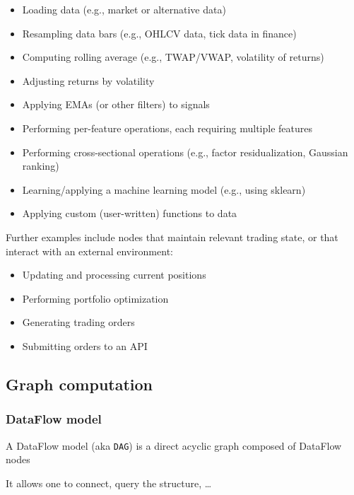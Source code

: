 \documentclass[11pt, reqno]{amsart}
\theoremstyle{definition}
\theoremstyle{remark}
\begin{document}
\begin{itemize}
  \item Loading data (e.g., market or alternative data)
  \item Resampling data bars (e.g., OHLCV data, tick data in finance)
  \item Computing rolling average (e.g., TWAP/VWAP, volatility of returns)
  \item Adjusting returns by volatility
  \item Applying EMAs (or other filters) to signals
  \item Performing per-feature operations, each requiring multiple features
  \item Performing cross-sectional operations (e.g., factor residualization,
        Gaussian ranking)
  \item Learning/applying a machine learning model (e.g., using sklearn)
  \item Applying custom (user-written) functions to data
\end{itemize}

Further examples include nodes that maintain relevant trading state, or
that interact with an external environment:

\begin{itemize}
  \item Updating and processing current positions
  \item Performing portfolio optimization
  \item Generating trading orders
  \item Submitting orders to an API
\end{itemize}

\subsection{Graph computation}

\subsubsection{DataFlow model}
A DataFlow model (aka \verb|DAG|) is a direct acyclic graph composed of
DataFlow nodes

It allows one to connect, query the structure, \ldots{}
\end{document}
